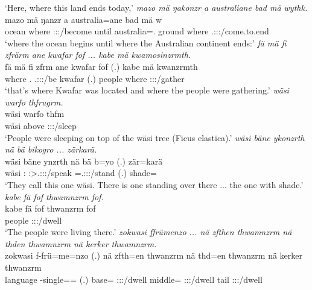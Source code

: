 \begin{exe}
	\trans `Here, where this land ends today,'
	\emph{mazo mä ŋakonzr a australiane bad mä wythk.}\\
	\gll mazo mä ŋanzr a australia=ane bad mä w\\ 
	ocean where \Stsg:\Sbj:\Nonpast:\Ipfv/become until australia=\Poss.{\Sg} ground where \Tsg.\F:\Sbj:\Nonpast:\Ipfv/come.to.end\\
	\trans `where the ocean begins until where the Australian continent ends:'
	\emph{fä mä fi zfrärm ane kwafar fof ... kabe mä kwamosinzrmth.}\\
	\gll fä mä fi zfrm ane kwafar fof (.) kabe mä kwanzrmth \\ 
	{\Dist} where \Third.{\Abs} \Tsg.\F:\Sbj:\Pst:\Dur/be {\Dem} kwafar {\Emph} (.) people where \Stpl:\Sbj:\Pst:\Dur/gather\\
	\trans `that's where Kwafar was located and where the people were gathering.'
\newpage 	
{} 
	\emph{wäsi warfo thfrugrm.}\\
	\gll wäsi warfo thfm\\ 
	wäsi above \Stpl:\Sbj:\Pst:\Dur/sleep\\
	\trans `People were sleeping on top of the wäsi tree (Ficus elastica).'
	\emph{wäsi bäne ykonzrth nä bä bikogro ... zärkarä.}\\
	\gll wäsi bäne ynzrth nä bä b=yo (.) zär=karä\\ 
	wäsi \Dem:\Med{} \Stpl:\Sbj>\Tsg.\Masc:\Obj:\Nonpast:\Ipfv/speak {\Indf} \Med{} \Med=\Tsg.\Masc:\Nonpast:\Ipfv:\Andat/stand (.) shade={\Prop}\\
	\trans `They call this one wäsi. There is one standing over there ... the one with shade.'
	\emph{kabe fä fof thwamnzrm fof.}\\
	\gll kabe fä fof thwanzrm fof\\ 
	people {\Dist} {\Emph} \Stpl:\Sbj:\Pst:\Dur/dwell {\Emph}\\
	\trans `The people were living there.'
	\emph{zokwasi ffrümenzo ... nä zfthen thwamnzrm nä thden thwamnzrm nä kerker thwamnzrm.}\\
	\gll zokwasi f-frü=me=nzo (.) nä zfth=en thwanzrm nä thd=en thwanzrm nä kerker thwanzrm\\ 
	language \Redup-single=\Ins={\Only} (.) {\Indf} base={\Loc} \Stpl:\Sbj:\Pst:\Dur/dwell {\Indf} middle={\Loc} \Stpl:\Sbj:\Pst:\Dur/dwell {\Indf} tail \Stpl:\Sbj:\Pst:\Dur/dwell\\

\end{exe}
